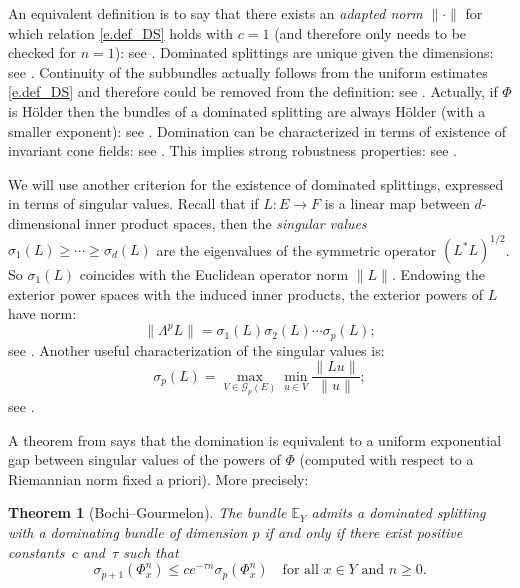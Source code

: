 \documentclass[10pt]{amsart}
\let\mathcal\mathscr
\theoremstyle{plain}
\newtheorem{theorem}{Theorem}[section]
\theoremstyle{definition}
\newcommand{\EE}{\mathbb{E}}
\newcommand{\cG}{\mathcal{G}}
\newcommand{\WEDGE}{\mathsf{\Lambda}}
\begin{document}
An equivalent definition is to say that there exists an \emph{adapted norm} $\| \mathord{\cdot} \|$ for which relation \eqref{e.def_DS} holds with $c=1$ (and therefore only needs to be checked for $n=1$): see \cite{Gourmelon}. Dominated splittings are unique given the dimensions: see \cite[Prop.\,2.2]{CroPo}. Continuity of the subbundles actually follows from the uniform estimates \eqref{e.def_DS} and therefore could be removed from the definition: see \cite[Prop.\,2.5]{CroPo}. Actually, if $\Phi$ is Hölder then the bundles of a dominated splitting are always Hölder (with a smaller exponent): see \cite[Th.\,4.11]{CroPo}.
Domination can be characterized in terms of existence of invariant cone fields: see \cite[Th.\,2.6]{CroPo}.
This implies strong robustness properties: see \cite[Cor.\,2.8]{CroPo}.

We will use another criterion for the existence of dominated splittings, expressed in terms of singular values.
Recall that if $L \colon E \to F$ is a linear map between $d$\nobreakdash-dimensional inner product spaces, then the \emph{singular values} $\sigma_1 (L) \ge \cdots \ge \sigma_d (L)$ are the eigenvalues of the symmetric operator $(L^* L)^{1/2}$. So $\sigma_1(L)$ coincides with the Euclidean operator norm $\|L\|$.
Endowing the exterior power spaces with the induced inner products, the exterior powers of $L$ have norm:
\begin{equation}\label{e.singular_wedge}
\| \WEDGE^p L \| = \sigma_1(L) \sigma_2(L) \cdots \sigma_p(L) ;
\end{equation}
see \eg \cite[p.\,120]{Arnold}.
Another useful characterization of the singular values is:
\begin{equation}\label{e.maxmin}
\sigma_p(L) = \max_{V \in \cG_p(E)} \min_{u \in V} \frac{\|L u\|}{\|u\|} ;
\end{equation}
see \eg \cite[p.\,68]{Stewart}.

A theorem from \cite{BG} says that the domination is equivalent to a uniform exponential gap between singular values of the powers of $\Phi$ (computed with respect to a Riemannian norm fixed a priori).
More precisely:

\begin{theorem}[Bochi--Gourmelon]\label{t.BG}
The bundle $\EE_Y$ admits a dominated splitting with a dominating bundle of dimension $p$ if and only if there exist positive constants~$c$ and~$\tau$ such that
\[
\sigma_{p+1}(\Phi_x^n) \le c e^{-\tau n} \sigma_p(\Phi_x^n) \quad \text{for all $x \in Y$ and $n \ge 0$.}
\]
\end{theorem}
\end{document}
